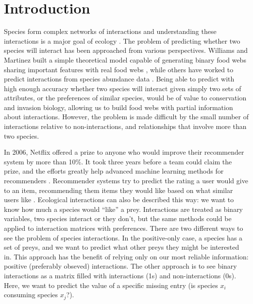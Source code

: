 \documentclass[letterpaper]{article}
\begin{document}
\section{Introduction}

Species form complex networks of interactions and understanding these
interactions is a major goal of ecology \cite{pim82}. The problem of predicting
whether two species will interact has been approached from various
perspectives. Williams and Martinez \cite{wil00} built a simple theoretical
model capable of generating binary food webs sharing important features with
real food webs %
, while others have worked to predict interactions from species
abundance data \cite{ade12}. Being able to predict with high enough accuracy
whether two species will interact given simply two sets of attributes, or the
preferences of similar species, would be of value to conservation and invasion
biology, allowing us to build food webs with partial information about
interactions. 
However, the problem is made difficult by the small number of
interactions relative to non-interactions, and relationships that involve more
than two species.

In 2006, Netflix offered a prize to anyone who would improve their recommender
system by more than 10\%. It took three years before a team could claim the
prize, and the efforts greatly help advanced machine learning methods for
recommenders \cite{mur12}. Recommender systems try to predict the rating a user
would give to an item, recommending them items they would like based on what
similar users like \cite{agg16}. Ecological interactions can also be described
this way: we want to know how much a species would ``like'' a prey.
Interactions are treated as binary variables, two species interact or they
don't, but the same methods could be applied to interaction matrices with
preferences. There are two different ways to see the problem of species
interactions. In the positive-only case, a species has a set of preys, and we
want to predict what other preys they might be interested in. This approach has
the benefit of relying only on our most reliable information: positive
(preferably obseved) interactions. The other approach is to see binary
interactions as a matrix filled with interactions (1s) and non-interactions
(0s). Here, we want to predict the value of a specific missing entry (is
species $x_i$ consuming species $x_j$?).
\end{document}
